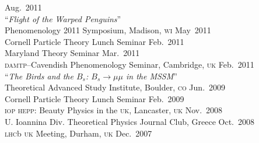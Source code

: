 \documentclass[margin,line]{resume}
\newcommand{\mytalksep}{-.1mm}
\newcommand{\mytalkskip}{2mm}
\newcommand{\scap}[1]{\textsc{\MakeLowercase{#1}}}
\begin{document}
\begin{resume}
Aug.~2011\vspace{\mytalkskip}\\ 
%
%
%
``\emph{Flight of the Warped Penguins}'' 
\vspace{\mytalksep}\\ 
Phenomenology 2011 Symposium, Madison, \scap{WI}
\hfill %
May~2011\vspace{\mytalksep}\\ 
Cornell Particle Theory Lunch Seminar
\hfill %
Feb.~2011\vspace{\mytalksep}\\   
%
Maryland Theory Seminar
\hfill %
Mar.~2011\vspace{\mytalksep}\\   
%
\scap{DAMTP}--Cavendish Phenomenology Seminar, Cambridge, \scap{UK}
\hfill %
Feb.~2011\vspace{\mytalkskip}\\
%
%
%
%
%
%
``\emph{The Birds and the $B_s$: $B_s \to \mu\mu$ in the MSSM}'' 
\vspace{\mytalksep}\\ 
Theoretical Advanced Study Institute, Boulder, \scap{CO}
\hfill %
Jun.~2009\vspace{\mytalksep}\\ 
%
Cornell Particle Theory Lunch Seminar
\hfill %
Feb.~2009\vspace{\mytalksep}\\   
%
\scap{IOP HEPP}: Beauty Physics in the \scap{UK}, Lancaster, \scap{UK}
\hfill %
Nov.~2008\vspace{\mytalksep}\\ 
%
U. Ioannina Div. Theoretical Physics Journal Club, Greece
\hfill %
Oct.~2008\vspace{\mytalksep}\\
%
\scap{LHC}b \scap{UK} Meeting, Durham, \scap{UK}
\hfill %
Dec.~2007%
%
%
%








\end{resume}
\end{document}
